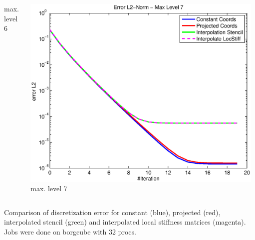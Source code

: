 \documentclass[t,compress=false,usepdftitle=false]{beamer}
\begin{document}
\begin{frame}
\begin{columns}[T]
\begin{column}[T]{4.3cm}
  max. level 6
\end{column}\hfill
\begin{column}[T]{4.3cm} 
  \centering
  \includegraphics[width=0.98\textwidth]{spherepoisson_errorEuc_level7}\\
  max. level 7
\end{column}
\end{columns}
\vspace{0.5cm}
\centering
Comparison of discretization error for constant (blue), projected (red), interpolated
stencil (green) and interpolated local stiffness matrices (magenta).
Jobs were done on borgcube with 32 procs.
\end{frame}
\end{document}
